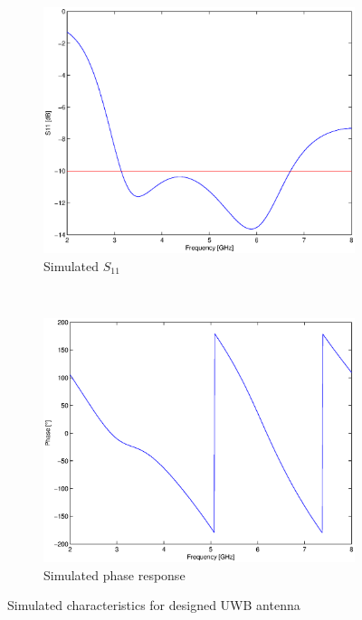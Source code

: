 \documentclass[a4paper]{article}        %
\begin{document}
		\begin{figure}[H]
		\begin{subfigure}{0.5\textwidth}
		\centering
			\includegraphics[width=\textwidth]{images/S11_ADS_sim.eps}
			\caption{Simulated $S_{11}$}
		\end{subfigure}%
    ~
		\begin{subfigure}{0.5\textwidth}
		\centering
			\includegraphics[width=\textwidth]{images/fase_respons_ADS_sim.eps}
			\caption{Simulated phase response}
		\end{subfigure}
		\caption{Simulated characteristics for designed UWB antenna}
		\label{fig:S11_phase_design}
		\end{figure}
\end{document}
